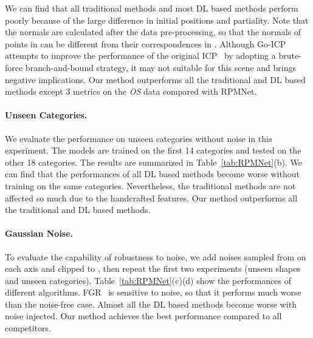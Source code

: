 \documentclass[10pt,twocolumn,letterpaper]{article}
\begin{document}
We can find that all traditional methods and most DL based methods perform poorly because of the large difference in initial positions and partiality. Note that the normals are calculated after the data pre-processing, so that the normals of points in  can be different from their correspondences in . Although Go-ICP~\cite{yang2013go} attempts to improve the performance of the original ICP~\cite{besl1992method} by adopting a brute-force branch-and-bound strategy, it may not suitable for this scene and brings negative implications. Our method outperforms all the traditional and DL based methods except 3 metrics on the \emph{OS} data compared with RPMNet. 



\vspace{-0.4cm}
\paragraph{Unseen Categories.}
We evaluate the performance on unseen categories without noise in this experiment. The models are trained on the first 14 categories and tested on the other 18 categories. The results are summarized in Table~\ref{tab:RPMNet}(b). We can find that the performances of all DL based methods become worse without training on the same categories. Nevertheless, the traditional methods are not affected so much due to the handcrafted features. Our method outperforms all the traditional and DL based methods.

\vspace{-0.4cm}
\paragraph{Gaussian Noise.}
To evaluate the capability of robustness to noise, we add noises sampled from  on each axis and clipped to , then repeat the first two experiments (unseen shapes and unseen categories). Table~\ref{tab:RPMNet}(c)(d) show the performances of different algorithms. FGR~\cite{zhou2016fast} is sensitive to noise, so that it performs much worse than the noise-free case. Almost all the DL based methods become worse with noise injected. Our method achieves the best performance compared to all competitors.
\end{document}
